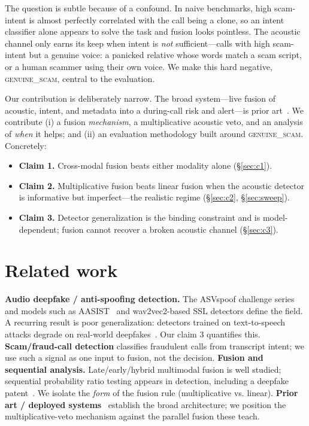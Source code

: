 \documentclass[11pt]{article}
\begin{document}
The question is subtle because of a confound. In naive benchmarks, high scam-intent is
almost perfectly correlated with the call being a clone, so an intent classifier alone
appears to solve the task and fusion looks pointless. The acoustic channel only earns its
keep when intent is \emph{not} sufficient---calls with high scam-intent but a genuine
voice: a panicked relative whose words match a scam script, or a human scammer using their
own voice. We make this hard negative, \textsc{genuine\_scam}, central to the evaluation.

Our contribution is deliberately narrow. The broad system---live fusion of acoustic,
intent, and metadata into a during-call risk and alert---is prior
art~\cite{us12284313,us10455085,us9692885}. We contribute (i) a fusion \emph{mechanism}, a
multiplicative acoustic veto, and an analysis of \emph{when} it helps; and (ii) an
evaluation methodology built around \textsc{genuine\_scam}. Concretely:
\begin{itemize}
  \item \textbf{Claim 1.} Cross-modal fusion beats either modality alone (\S\ref{sec:c1}).
  \item \textbf{Claim 2.} Multiplicative fusion beats linear fusion when the acoustic
  detector is informative but imperfect---the realistic regime (\S\ref{sec:c2},
  \S\ref{sec:sweep}).
  \item \textbf{Claim 3.} Detector generalization is the binding constraint and is
  model-dependent; fusion cannot recover a broken acoustic channel (\S\ref{sec:c3}).
\end{itemize}

\section{Related work}
\textbf{Audio deepfake / anti-spoofing detection.} The ASVspoof challenge
series~\cite{asvspoof2019} and models such as AASIST~\cite{aasist} and wav2vec2-based SSL
detectors define the field. A recurring result is poor generalization: detectors trained on
text-to-speech attacks degrade on real-world deepfakes~\cite{inthewild}. Our claim 3
quantifies this. \textbf{Scam/fraud-call detection} classifies fraudulent calls from
transcript intent; we use such a signal as one input to fusion, not the decision.
\textbf{Fusion and sequential analysis.} Late/early/hybrid multimodal fusion is well
studied; sequential probability ratio testing appears in detection, including a deepfake
patent~\cite{us12347238}. We isolate the \emph{form} of the fusion rule (multiplicative vs.
linear). \textbf{Prior art / deployed systems}~\cite{us12284313,us10455085,us9692885}
establish the broad architecture; we position the multiplicative-veto mechanism against the
parallel fusion these teach.
\end{document}
